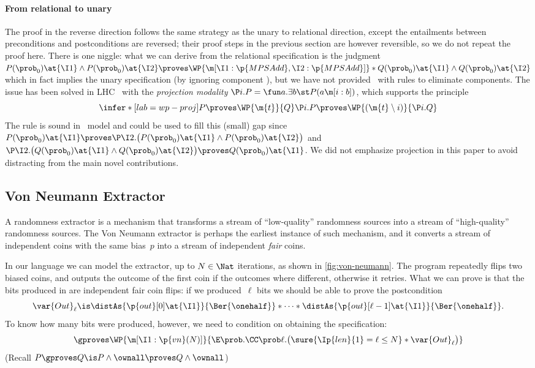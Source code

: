 \documentclass[acmsmall,nonacm,screen,appendix]{acmart}
\begin{document}
\paragraph{From relational to unary}
The proof in the reverse direction follows the same strategy as the unary to relational direction, except the entailments between preconditions and postconditions are reversed; their proof steps in the previous section are however reversible, so we do not repeat the proof here.
There is one niggle:
what we can derive from the relational specification is the judgment
$
  P(\prob_0)\at{\I1} \land P(\prob_0)\at{\I2}
  \proves
  \WP {\m[\I1: \p{MPSAdd}, \I2: \p{MPSAdd}]}*{
    Q(\prob_0)\at{\I1} \land Q(\prob_0)\at{\I2}
  }
$
which in fact implies the unary specification (by ignoring component ),
but we have not provided \thelogic\ with rules to eliminate components.
The issue has been solved in LHC~\cite{d2022proving} with
the \emph{projection modality}
$ \P i. P = \fun a. \exists b\st P(a\m[i: b]) $,
which supports the principle
\[
  \infer*[lab=wp-proj]{
    P \proves \WP {\m{t}} {Q}
  }{
    \P i. P \proves \WP {(\m{t}\setminus i)} {\P i.Q}
  }
\]
The rule is sound in \thelogic\ model and could be used to fill this (small) gap
since
$
  P(\prob_0)\at{\I1}
  \proves
  \P\I2.\bigl(P(\prob_0)\at{\I1} \land P(\prob_0)\at{\I2}\bigr)
$ and
$
  \P\I2.\bigl(Q(\prob_0)\at{\I1} \land Q(\prob_0)\at{\I2}\bigr)
  \proves
  Q(\prob_0)\at{\I1}
$.
We did not emphasize projection in this paper to avoid distracting from the main novel contributions.
 

\subsection{Von Neumann Extractor}
\label{sec:appendix:ex:von-neumann}

  A randomness extractor is a mechanism that transforms a stream of
``low-quality'' randomness sources into a stream of ``high-quality''
randomness sources.
The Von Neumann extractor is perhaps the earliest instance of such mechanism,
and it converts a stream of independent coins with the same bias~$p$
into a stream of independent \emph{fair} coins.

In our language we can model the extractor, up to $N \in \Nat$ iterations,
as shown in \cref{fig:von-neumann}.
The program repeatedly flips two biased coins, and outputs the outcome of the first coin if the outcomes where different, otherwise it retries.
What we can prove is that the bits produced in  are independent fair coin flips: if we produced~$\ell$ bits we should be able to prove the postcondition
\[
  \var{Out}_\ell \is
  \distAs{\p{out}[0]\at{\I1}}{\Ber{\onehalf}} *
  \dots *
  \distAs{\p{out}[\ell-1]\at{\I1}}{\Ber{\onehalf}}.
\]
To know how many bits were produced, however,
we need to condition on 
obtaining the specification:
\[
  \gproves \WP {\m[\I1: \p{vn}(N)]} {
    \E \prob. \CC \prob \ell. \bigl(
      \sure{\Ip{len}{1} = \ell \leq N} *
      \var{Out}_\ell
    \bigr)
  }
\]
(Recall $ P \gproves Q \is P \land \ownall \proves Q \land \ownall $)
\end{document}

